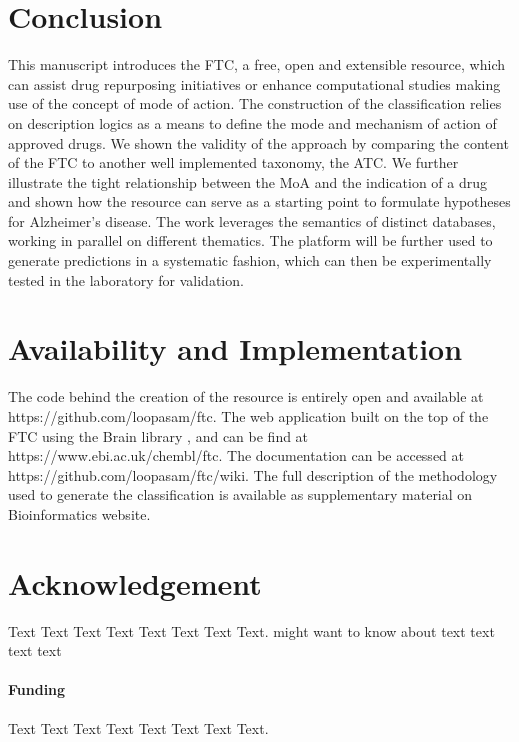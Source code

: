 \documentclass{bioinfo}
\begin{document}
\section{Conclusion}
This manuscript introduces the FTC, a free, open and extensible resource, which can assist drug repurposing 
initiatives or enhance computational studies making use of the concept of mode of action. The construction of 
the classification relies on description logics as a means to define the mode and mechanism of action of approved 
drugs. We shown the validity of the approach by comparing the content of the FTC to another well implemented taxonomy, 
the ATC. We further illustrate the tight relationship between the MoA and the indication of a drug and shown how the 
resource can serve as a starting point to formulate hypotheses for Alzheimer's disease. The work leverages the 
semantics of distinct databases, working in parallel on different thematics. The platform will be further used 
to generate predictions in a systematic fashion, which can then be experimentally tested in the laboratory for validation.

\section{Availability and Implementation}\label{impl}
The code behind the creation of the resource is entirely open and available 
at {{https://github.com/loopasam/ftc}}. The web application built on the top of the FTC using the Brain library \citep{Croset2013}, and can be 
find at {{https://www.ebi.ac.uk/chembl/ftc}}. The documentation can be accessed at {{https://github.com/loopasam/ftc/wiki}}. The full
description of the methodology used to generate the classification is available as supplementary material on Bioinformatics website.

\section*{Acknowledgement}
Text Text Text Text Text Text  Text Text.  \citealp{Boffelli03} might want to know about  text text text text

\paragraph{Funding\textcolon} Text Text Text Text Text Text  Text Text.












\end{document}
